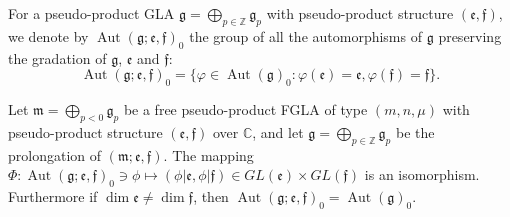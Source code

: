 \documentclass[pdftex]{sigma}
\numberwithin{equation}{section}
\numberwithin{theorem}{section}
\numberwithin{proposition}{section}
\numberwithin{lemma}{section}
\numberwithin{corollary}{section}
\numberwithin{definition}{section}
\numberwithin{example}{section}
\numberwithin{remark}{section}
\numberwithin{note}{section}
\newcommand{\Aut}{\operatorname{Aut}}
\newcommand{\gla}[1]{\mathfrak#1=\bigoplus\limits_{p\in\mathbb Z}\mathfrak#1_p} \renewcommand{\labelenumi}{{\rm (\arabic{enumi})}}
\begin{document}
For a pseudo-product GLA $\gla g$ with pseudo-product structure
$(\mathfrak e,\mathfrak f)$,
we denote by $\Aut(\mathfrak g;\mathfrak e,\mathfrak f)_0$ the group of all the automorphisms of
$\mathfrak g$ preserving the gradation of $\mathfrak g$, $\mathfrak e$
and $\mathfrak f$:
\[
\Aut(\mathfrak g;\mathfrak e,\mathfrak f)_0
=\{\varphi\in\Aut(\mathfrak g)_0:
\varphi(\mathfrak e)=\mathfrak e,\varphi(\mathfrak f)=\mathfrak f
\}.
\]

\begin{theorem}\label{thm9.2} Let $\mathfrak m=\bigoplus\limits_{p<0}\mathfrak g_p$ be a
free pseudo-product FGLA of type $(m,n,\mu)$ with pseudo-product structure
$(\mathfrak e,\mathfrak f)$ over $\mathbb C$, and let
$\mathfrak g
=\bigoplus\limits_{p\in\mathbb Z}\mathfrak g_p$
be the prolongation of $(\mathfrak m;\mathfrak e,\mathfrak f)$.
The mapping $\Phi:\Aut(\mathfrak g;\mathfrak e,\mathfrak f)_0\ni\phi\mapsto
(\phi|\mathfrak e,\phi|\mathfrak f)\in GL(\mathfrak e)\times GL(\mathfrak f)$
is an isomorphism.
Furthermore if $\dim\mathfrak e\ne\dim \mathfrak f$,
then $\Aut(\mathfrak g;\mathfrak e,\mathfrak f)_0=\Aut(\mathfrak g)_0$.
\end{theorem}
\end{document}
